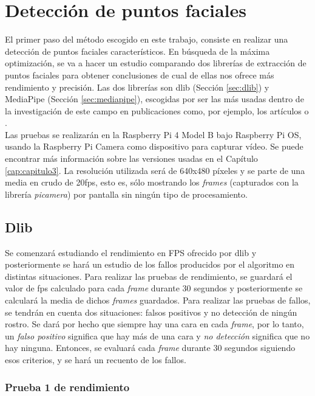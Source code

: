 \section{Detección de puntos faciales}
\label{sec:deteccion_de puntos}

El primer paso del método escogido en este trabajo, consiste en realizar una detección de puntos faciales característicos. En búsqueda de la máxima optimización, se va a hacer un estudio comparando dos librerías de extracción de puntos faciales para obtener conclusiones de cual de ellas nos ofrece más rendimiento y precisión. Las dos librerías son dlib (Sección \ref{sec:dlib}) y MediaPipe (Sección \ref{sec:mediapipe}), escogidas por ser las más usadas dentro de la investigación de este campo en publicaciones como, por ejemplo, los artículos \cite{dlib_emotions} o \cite{mediapipe_emotions}.\\

Las pruebas se realizarán en la Raspberry Pi 4 Model B bajo Raspberry Pi OS, usando la Raspberry Pi Camera como dispositivo para capturar vídeo. Se puede encontrar más información sobre las versiones usadas en el Capítulo \ref{cap:capitulo3}. La resolución utilizada será de 640x480 píxeles y se parte de una media en crudo de 20fps, esto es, sólo mostrando los \textit{frames} (capturados con la librería \textit{picamera}) por pantalla sin ningún tipo de procesamiento.

\subsection{Dlib}

Se comenzará estudiando el rendimiento en FPS ofrecido por dlib y posteriormente se hará un estudio de los fallos producidos por el algoritmo en distintas situaciones. Para realizar las pruebas de rendimiento, se guardará el valor de fps calculado para cada \textit{frame} durante 30 segundos y posteriormente se calculará la media de dichos \textit{frames} guardados. Para realizar las pruebas de fallos, se tendrán en cuenta dos situaciones: falsos positivos y no detección de ningún rostro. Se dará por hecho que siempre hay una cara en cada \textit{frame}, por lo tanto, un \textit{falso positivo} significa que hay más de una cara y \textit{no detección} significa que no hay ninguna. Entonces, se evaluará cada \textit{frame} durante 30 segundos siguiendo esos criterios, y se hará un recuento de los fallos.

\subsubsection{Prueba 1 de rendimiento}

